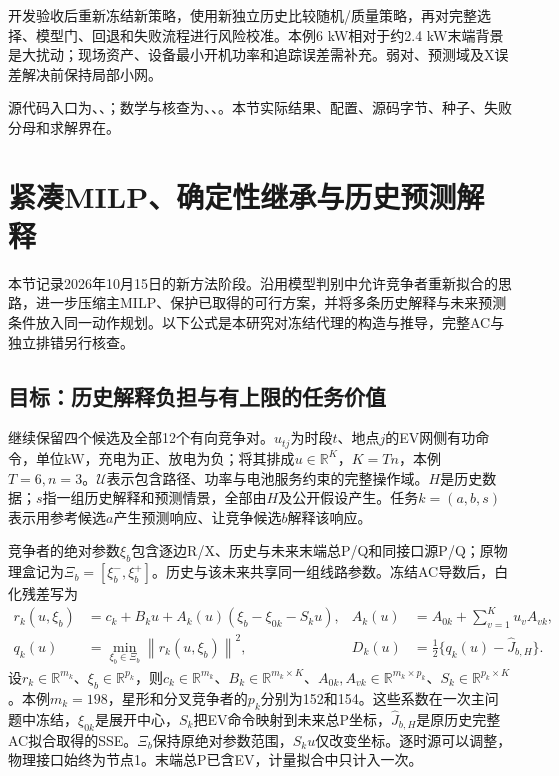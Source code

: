 \documentclass[UTF8,fontset=fandol,11pt,a4paper]{ctexart}
\newcommand{\R}{\mathbb R}
\newcommand{\norm}[1]{\left\lVert#1\right\rVert}
\begin{document}
开发验收后重新冻结新策略，使用新独立历史比较随机/质量策略，再对完整选择、模型门、回退和失败流程进行风险校准。本例6 kW相对于约2.4 kW末端背景是大扰动；现场资产、设备最小开机功率和追踪误差需补充。弱对、预测域及X误差解决前保持局部小网。


源代码入口为、、；数学与核查为、、。本节实际结果、配置、源码字节、种子、失败分母和求解界在。


\clearpage
\section{紧凑MILP、确定性继承与历史预测解释}
\label{sec:compact-policy}
本节记录2026年10月15日的新方法阶段。沿用模型判别中允许竞争者重新拟合的思路\cite{dette}，进一步压缩主MILP、保护已取得的可行方案，并将多条历史解释与未来预测条件放入同一动作规划。以下公式是本研究对冻结代理的构造与推导，完整AC与独立排错另行核查。

\subsection{目标：历史解释负担与有上限的任务价值}
继续保留四个候选及全部12个有向竞争对。$u_{tj}$为时段$t$、地点$j$的EV网侧有功命令，单位kW，充电为正、放电为负；将其排成$u\in\R^K$，$K=Tn$，本例$T=6,n=3$。$\mathcal U$表示包含路径、功率与电池服务约束的完整操作域。$H$是历史数据；$s$指一组历史解释和预测情景，全部由$H$及公开假设产生。任务$k=(a,b,s)$表示用参考候选$a$产生预测响应、让竞争候选$b$解释该响应。

竞争者的绝对参数$\xi_b$包含逐边R/X、历史与未来末端总P/Q和同接口源P/Q；原物理盒记为$\Xi_b=[\xi_b^-,\xi_b^+]$。历史与该未来共享同一组线路参数。冻结AC导数后，白化残差写为
\begin{align}
 r_k(u,\xi_b)&=c_k+B_ku+A_k(u)(\xi_b-\xi_{0k}-S_ku),
 &A_k(u)&=A_{0k}+\sum_{v=1}^K u_vA_{vk},\label{eq:compact-proxy}\\
 q_k(u)&=\min_{\xi_b\in\Xi_b}\norm{r_k(u,\xi_b)}^2,
 &D_k(u)&=\tfrac12\{q_k(u)-\widehat J_{b,H}\}.
 \label{eq:compact-task}
\end{align}
设$r_k\in\R^{m_k}$、$\xi_b\in\R^{p_k}$，则$c_k\in\R^{m_k}$、$B_k\in\R^{m_k\times K}$、$A_{0k},A_{vk}\in\R^{m_k\times p_k}$、$S_k\in\R^{p_k\times K}$。本例$m_k=198$，星形和分叉竞争者的$p_k$分别为152和154。这些系数在一次主问题中冻结，$\xi_{0k}$是展开中心，$S_k$把EV命令映射到未来总P坐标，$\widehat J_{b,H}$是原历史完整AC拟合取得的SSE。$\Xi_b$保持原绝对参数范围，$S_ku$仅改变坐标。逐时源可以调整，物理接口始终为节点1。末端总P已含EV，计量拟合中只计入一次。
\end{document}
